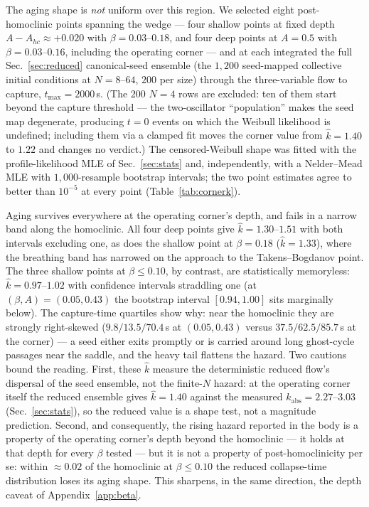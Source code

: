 The aging shape is \emph{not} uniform over this region. We selected eight
post-homoclinic points spanning the wedge --- four shallow points at fixed depth
$A - A_{hc} \approx +0.020$ with $\beta = 0.03$--$0.18$, and four deep points at
$A = 0.5$ with $\beta = 0.03$--$0.16$, including the operating corner --- and at
each integrated the full Sec.~\ref{sec:reduced} canonical-seed ensemble (the
$1{,}200$ seed-mapped collective initial conditions at $N = 8$--$64$, $200$ per
size) through the three-variable flow to capture, $t_{\max} = 2000$\,s. (The
$200$ $N = 4$ rows are excluded: ten of them start beyond the capture threshold
--- the two-oscillator ``population'' makes the seed map degenerate, producing
$t = 0$ events on which the Weibull likelihood is undefined; including them via
a clamped fit moves the corner value from $\hat k = 1.40$ to $1.22$ and changes
no verdict.) The censored-Weibull shape was fitted with the
profile-likelihood MLE of Sec.~\ref{sec:stats} and, independently, with a
Nelder--Mead MLE with $1{,}000$-resample bootstrap intervals; the two point
estimates agree to better than $10^{-5}$ at every point
(Table~\ref{tab:cornerk}).

Aging survives everywhere at the operating corner's depth, and fails in a
narrow band along the homoclinic. All four deep points give
$\hat k = 1.30$--$1.51$ with both intervals excluding one, as does the shallow
point at $\beta = 0.18$ ($\hat k = 1.33$), where the breathing band has
narrowed on the approach to the Takens--Bogdanov point. The three shallow
points at $\beta \le 0.10$, by contrast, are statistically memoryless:
$\hat k = 0.97$--$1.02$ with confidence intervals straddling one (at
$(\beta, A) = (0.05, 0.43)$ the bootstrap interval $[0.94, 1.00]$ sits
marginally below). The capture-time quartiles show why: near the homoclinic
they are strongly right-skewed ($9.8/13.5/70.4$\,s at $(0.05, 0.43)$ versus
$37.5/62.5/85.7$\,s at the corner) --- a seed either exits promptly or is
carried around long ghost-cycle passages near the saddle, and the heavy tail
flattens the hazard. Two cautions bound the reading. First, these $\hat k$
measure the deterministic reduced flow's dispersal of the seed ensemble, not
the finite-$N$ hazard: at the operating corner itself the reduced ensemble
gives $\hat k = 1.40$ against the measured $k_{\mathrm{abs}} = 2.27$--$3.03$
(Sec.~\ref{sec:stats}), so the reduced value is a shape test, not a magnitude
prediction. Second, and consequently, the rising hazard reported in the body
is a property of the operating corner's depth beyond the homoclinic --- it
holds at that depth for every $\beta$ tested --- but it is not a property of
post-homoclinicity per se: within ${\approx}0.02$ of the homoclinic at
$\beta \le 0.10$ the reduced collapse-time distribution loses its aging shape.
This sharpens, in the same direction, the depth caveat of
Appendix~\ref{app:beta}.

